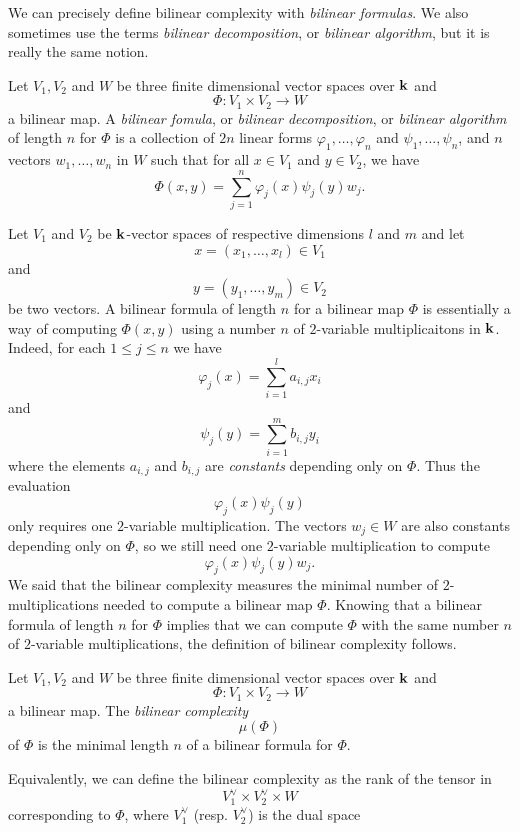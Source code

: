 We can precisely define bilinear complexity with \emph{bilinear formulas}. We
also sometimes use the terms \emph{bilinear decomposition}, or \emph{bilinear
algorithm}, but it is really the same notion.
\begin{defi}
  \label{defi:bilinear-formula}
  Let $V_1, V_2$ and $W$ be three finite dimensional vector spaces over $\mathbf{k}$ and 
  \[
    \Phi:V_1\times V_2\to W
  \]
  a bilinear map. A \emph{bilinear fomula}, or \emph{bilinear decomposition}, or
  \emph{bilinear algorithm} of length $n$ for $\Phi$ is a
  collection of $2n$ linear forms $\varphi_1, \dots, \varphi_n$ and $\psi_1,
  \dots, \psi_n$, and $n$ vectors $w_1, \dots, w_n$ in $W$ such that for all
  $x\in V_1$ and $y\in V_2$, we have
  \[
    \Phi(x, y) = \sum_{j=1}^n \varphi_j(x)\psi_j(y)w_j.
  \]
\end{defi}
Let $V_1$ and $V_2$ be $\mathbf{k}$-vector spaces of respective dimensions $l$ and $m$
and let
\[
  x = (x_1, \dots, x_l)\in V_1
\]
and
\[
  y = (y_1, \dots, y_m)\in V_2
\]
be two vectors.
A bilinear formula of length $n$ for a bilinear map $\Phi$ is essentially a way
of computing $\Phi(x, y)$ using a number $n$ of $2$-variable multiplicaitons in $\mathbf{k}$.
Indeed, for each $1\leq j \leq n$ we have
\[
  \varphi_j(x) = \sum_{i=1}^l a_{i, j}x_i
\]
and
\[
  \psi_j(y) = \sum_{i=1}^m b_{i, j}y_i
\]
where the elements $a_{i, j}$ and $b_{i, j}$ are \emph{constants} depending only
on $\Phi$. Thus the evaluation
\[
  \varphi_j(x)\psi_j(y)
\]
only requires one $2$-variable multiplication. The vectors $w_j\in W$ are also
constants depending only on $\Phi$, so we still need one $2$-variable
multiplication to compute 
\[
  \varphi_j(x)\psi_j(y)w_j.
\]
We said that the bilinear complexity measures the minimal number of
$2$-multiplications needed to compute a bilinear map $\Phi$. Knowing that a
bilinear formula of length $n$ for $\Phi$ implies that we can compute $\Phi$
with the same number $n$ of $2$-variable multiplications, the definition of
bilinear complexity follows.
\begin{defi}
  Let $V_1, V_2$ and $W$ be three finite dimensional vector spaces over $\mathbf{k}$ and 
  \[
    \Phi:V_1\times V_2\to W
  \]
  a bilinear map. The \emph{bilinear complexity} 
  \[
    \mu(\Phi)
  \]
  of $\Phi$ is the minimal length $n$ of a bilinear formula for $\Phi$.
\end{defi}
Equivalently, we can define the bilinear complexity as the rank of the tensor in 
\[
  V_1^\vee \times V_2^\vee \times W
\]
corresponding to $\Phi$, where $V_1^\vee$ (resp. $V_2^\vee$) is the dual space

